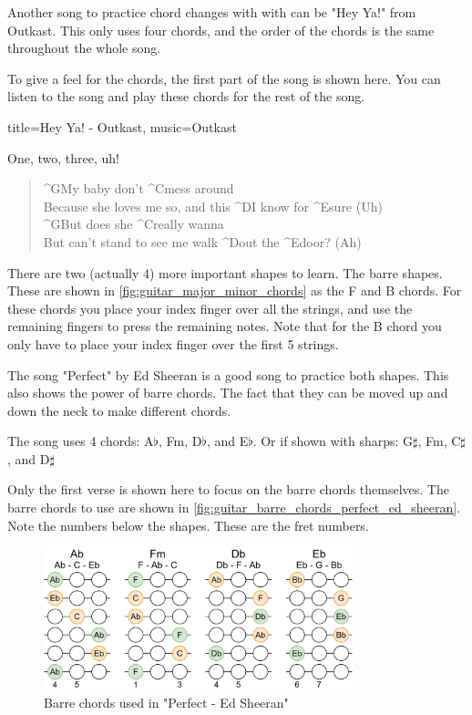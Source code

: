 \newpage

Another song to practice chord changes with with can be "Hey Ya!" from Outkast. This only uses four chords, and the order of the chords is the same throughout the whole song.

To give a feel for the chords, the first part of the song is shown here. You can listen to the song and play these chords for the rest of the song.

\begin{song}[verse/numbered, align-chords=l]{title={Hey Ya! - Outkast}, music={Outkast}}
	\begin{intro}
		One, two, three, uh!
	\end{intro}
	\begin{verse}
		^{G}My baby don't ^{C}mess around \\
		Because she loves me so, and this ^{D}I know for ^{E}sure (Uh) \\
		^{G}But does she ^{C}really wanna \\
		But can't stand to see me walk ^{D}out the ^{E}door? (Ah) \\
	\end{verse}
\end{song}

\newpage

There are two (actually 4) more important shapes to learn. The barre shapes. These are shown in \autoref{fig:guitar_major_minor_chords} as the F and B chords. For these chords you place your index finger over all the strings, and use the remaining fingers to press the remaining notes. Note that for the B chord you only have to place your index finger over the first 5 strings.

The song "Perfect" by Ed Sheeran is a good song to practice both shapes. This also shows the power of barre chords. The fact that they can be moved up and down the neck to make different chords.

The song uses 4 chords: A$\flat$, Fm, D$\flat$, and E$\flat$. Or if shown with sharps: G$\sharp$, Fm, C$\sharp$, and D$\sharp$

Only the first verse is shown here to focus on the barre chords themselves. The barre chords to use are shown in \autoref{fig:guitar_barre_chords_perfect_ed_sheeran}. Note the numbers below the shapes. These are the fret numbers.


\begin{figure}[h]
	\centering
	\includegraphics[width=0.8\textwidth]{../../Images/ChordsUsedInPerfectEdSheeran.png}
	\caption{Barre chords used in "Perfect - Ed Sheeran"}
	\label{fig:guitar_barre_chords_perfect_ed_sheeran}
\end{figure}


